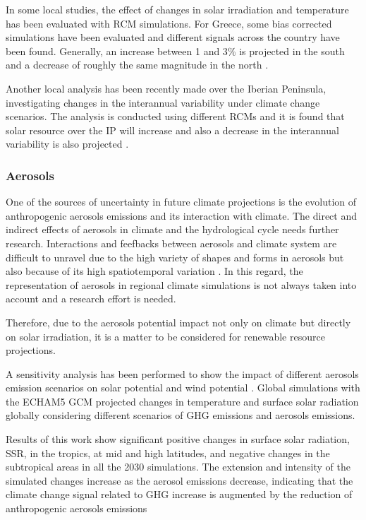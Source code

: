 In some local studies, the effect of changes in solar irradiation and temperature has been evaluated with RCM simulations. For Greece, some bias corrected simulations have been evaluated and different signals across the country have been found. Generally, an increase between 1 and 3$\%$ is projected in the south and a decrease of roughly the same magnitude in the north \cite*{panagea2014}. 

Another local analysis has been recently made over the Iberian Peninsula, investigating changes in the interannual variability under climate change scenarios. The analysis is conducted using different RCMs and it is found that solar resource over the IP will increase and also a decrease in the interannual variability is also projected \cite*{Gil2019}.

\subsubsection{Aerosols}

One of the sources of uncertainty in future climate projections is the evolution of anthropogenic aerosols emissions and its interaction with climate. The direct and indirect effects of aerosols in climate and the hydrological cycle needs further research. Interactions and feefbacks between aerosols and climate system are difficult to unravel due to the high variety of shapes and forms in aerosols but also because of its high spatiotemporal variation \cite*{Kaufman2002}. In this regard, the representation of aerosols in regional climate simulations is not always taken into account and a research effort is needed.  
 
Therefore, due to the aerosols potential impact not only on climate but directly on solar irradiation, it is a matter to be considered for renewable resource projections.

A sensitivity analysis has been performed to show the impact of different aerosols emission scenarios on solar potential and wind potential \cite*{Gaetani2014}. Global simulations with the ECHAM5 GCM projected changes in temperature and surface solar radiation globally considering different scenarios of GHG emissions and aerosols emissions. 

Results of this work show significant positive changes in surface solar radiation, SSR, in the tropics, at mid and high latitudes, and negative changes in the subtropical areas in all the 2030 simulations. The extension and intensity of the simulated changes increase as the aerosol emissions decrease, indicating that the climate change signal related to GHG increase is augmented by the reduction of anthropogenic aerosols emissions \cite*{Kloster2008, Kloster2010}

